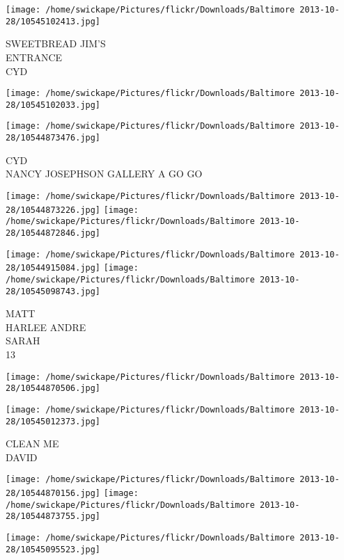 \documentclass[10pt,letterpaper]{article}
\begin{document}
\texttt{[image: /home/swickape/Pictures/flickr/Downloads/Baltimore 2013-10-28/10545102413.jpg]}

SWEETBREAD JIM'S\\
ENTRANCE\\
CYD\\
\pagebreak

\texttt{[image: /home/swickape/Pictures/flickr/Downloads/Baltimore 2013-10-28/10545102033.jpg]}

\vspace{0.25in}
\texttt{[image: /home/swickape/Pictures/flickr/Downloads/Baltimore 2013-10-28/10544873476.jpg]}

CYD\\
NANCY JOSEPHSON GALLERY A GO GO\\
\pagebreak

\texttt{[image: /home/swickape/Pictures/flickr/Downloads/Baltimore 2013-10-28/10544873226.jpg]}
\texttt{[image: /home/swickape/Pictures/flickr/Downloads/Baltimore 2013-10-28/10544872846.jpg]}

\texttt{[image: /home/swickape/Pictures/flickr/Downloads/Baltimore 2013-10-28/10544915084.jpg]}
\texttt{[image: /home/swickape/Pictures/flickr/Downloads/Baltimore 2013-10-28/10545098743.jpg]}

MATT\\
HARLEE ANDRE\\
SARAH\\
13\\
\pagebreak

\texttt{[image: /home/swickape/Pictures/flickr/Downloads/Baltimore 2013-10-28/10544870506.jpg]}

\vspace{0.25in}
\texttt{[image: /home/swickape/Pictures/flickr/Downloads/Baltimore 2013-10-28/10545012373.jpg]}

CLEAN ME\\
DAVID\\
\pagebreak

\texttt{[image: /home/swickape/Pictures/flickr/Downloads/Baltimore 2013-10-28/10544870156.jpg]}
\texttt{[image: /home/swickape/Pictures/flickr/Downloads/Baltimore 2013-10-28/10544873755.jpg]}

\vspace{0.25in}
\texttt{[image: /home/swickape/Pictures/flickr/Downloads/Baltimore 2013-10-28/10545095523.jpg]}
\end{document}
